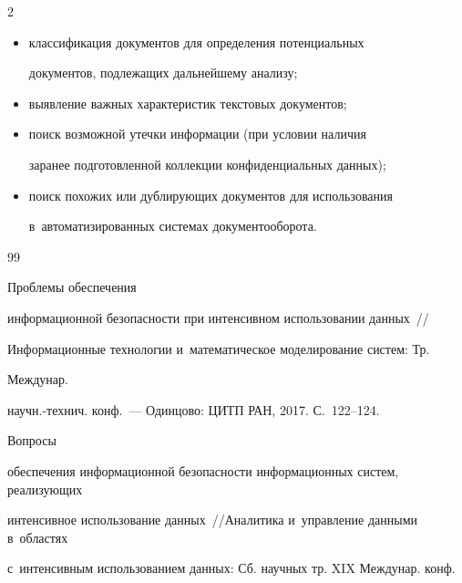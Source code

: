 \begin{multicols}{2}
\begin{itemize}
  \item классификация документов для определения потенциальных 


документов, подлежащих дальнейшему анализу;


\item выявление важных характеристик текстовых документов;


\item поиск возможной утечки информации (при условии наличия 


заранее подготовленной коллекции конфиденциальных данных);


\item поиск похожих или дублирующих документов для использования 


в~автоматизированных сис\-те\-мах документооборота.


  \end{itemize}


  


{\small\frenchspacing


{%




\begin{thebibliography}{99}







 Проб\-ле\-мы обеспечения 


информационной безопас\-ности при интенсивном использовании данных~// 


Информационные технологии и~математическое моделирование сис\-тем: Тр. 


Междунар. 


на\-учн.-тех\-нич. конф.~--- Одинцово: ЦИТП РАН, 2017. С.~122--124.




 Вопросы 


обеспечения информационной безопас\-ности информационных систем, реализующих 


интенсивное использование данных~//\linebreak Аналитика и~управ\-ле\-ние данными в~областях 


с~интенсивным использованием данных: Сб. научных тр. XIX Междунар. конф. 



\end{thebibliography}}}
\end{multicols}
